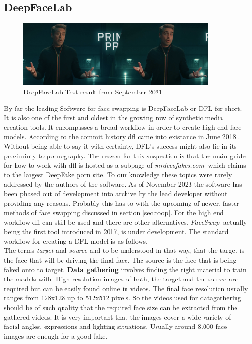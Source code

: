\documentclass[
  a4paper,  %
  twoside,  %
  bibliography=totoc,
  headsepline,
  cleardoublepage=empty,
  parskip=half,
  draft=false
]{scrbook}
\begin{document}
\subsection{DeepFaceLab}
\begin{figure}[h]
  \centering
  \includegraphics[width=0.9\textwidth]{./graphics/images/dfl-demo.png}
  \caption{DeepFaceLab Test result from September 2021}
  \label{fig:dfl-sample}
\end{figure}
By far the leading Software for face swapping is DeepFaceLab or DFL for short. It is also one of the first and oldest in the growing row of synthetic media creation tools. It encompasses a broad workflow in order to create high end face models. According to the commit history \gls{dfl} came into existance in June 2018 \cite{iperovCommitsIperovDeepFaceLab}. Without being able to say it with certainty, DFL's success might also lie in its proximinty to pornography. The reason for this suspection is that the main guide for how to work with \gls{dfl} is hosted as a subpage of \textit{mrdeepfakes.com}, which claims to the largest DeepFake porn site. To our knowledge these topics were rarely addressed by the authors of the software. As of November 2023 the software has been phased out of development into archive by the lead developer without providing any reasons. Probably this has to with the upcoming of newer, faster methods of face swapping discussed in section \ref{sec:roop}. For the high end workflow \gls{dfl} can still be used and there are other alternatives. \textit{FaceSwap}, actually being the first tool introduced in 2017, is under development. The standard workflow for creating a DFL model is as follows. \\ 
The terms \textit{target} and \textit{source} and to be understood in that way, that the target is the face that will be driving the final face. The source is the face that is being faked onto to target.
\textbf{Data gathering} involves finding the right material to train the models with. High resolution images of both, the target and the source are required but can be easily found online in videos. The final face resolution usually ranges from 128x128 up to 512x512 pixels. So the videos used for datagathering should be of such quality that the required face size can be extracted from the gathered videos. It is very important that the images cover a wide variety of facial angles, expressions and lighting situations. Usually around 8.000 face images are enough for a good fake.
\end{document}
